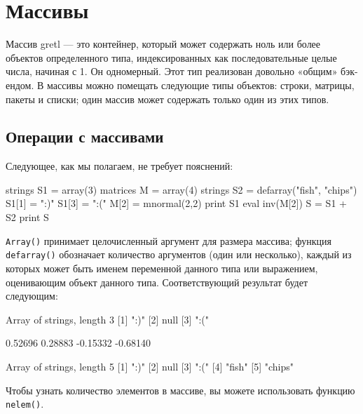 \section{Массивы}
\label{sec:arrays}

Массив gretl --- это контейнер, который может содержать ноль или более
объектов определенного типа, индексированных как последовательные
целые числа, начиная с 1. Он одномерный. Этот тип реализован довольно
«общим» бэк-ендом. В массивы можно помещать следующие типы объектов:
строки, матрицы, пакеты и списки; один массив может содержать только
один из этих типов.

\subsection{Операции с массивами}

Следующее, как мы полагаем, не требует пояснений:

\begin{code}
strings S1 = array(3)
matrices M = array(4)
strings S2 = defarray("fish", "chips")
S1[1] = ":)"
S1[3] = ":("
M[2] = mnormal(2,2)
print S1
eval inv(M[2])
S = S1 + S2
print S
\end{code}

\texttt{Array()} принимает целочисленный аргумент для размера массива;
функция \texttt{defarray()} обозначает количество аргументов (один или
несколько), каждый из которых может быть именем переменной данного
типа или выражением, оценивающим объект данного типа. Соответствующий
результат будет следующим:

\begin{code}
Array of strings, length 3
[1] ":)"
[2] null
[3] ":("

     0.52696      0.28883 
    -0.15332     -0.68140 

Array of strings, length 5
[1] ":)"
[2] null
[3] ":("
[4] "fish"
[5] "chips"
\end{code}

Чтобы узнать количество элементов в массиве, вы можете использовать функцию
\texttt{nelem()}.


